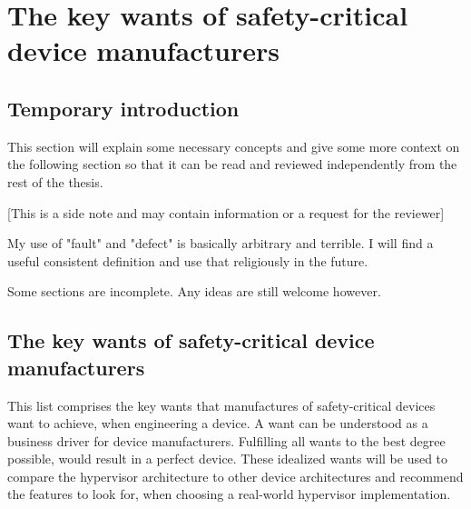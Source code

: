 
\chapter{The key wants of safety-critical device manufacturers} %

\label{Chapter3} %


\newcommand{\keyword}[1]{\textbf{#1}}
\newcommand{\tabhead}[1]{\textbf{#1}}
\newcommand{\code}[1]{\texttt{#1}}
\newcommand{\file}[1]{\texttt{\bfseries#1}}
\newcommand{\option}[1]{\texttt{\itshape#1}}


\section{Temporary introduction}
This section will explain some necessary concepts and give some more context on the following section so that it can be read and reviewed independently from the rest of the thesis.

[This is a side note and may contain information or a request for the reviewer]

My use of "fault" and "defect" is basically arbitrary and terrible. I will find a useful consistent definition and use that religiously in the future.

Some sections are incomplete. Any ideas are still welcome however.

\section{The key wants of safety-critical device manufacturers}
This list comprises the key wants that manufactures of safety-critical devices want to achieve, when engineering a device. A want can be understood as a business driver for device manufacturers. Fulfilling all wants to the best degree possible, would result in a perfect device. These idealized wants will be used to compare the hypervisor architecture to other device architectures and recommend the features to look for, when choosing a real-world hypervisor implementation.

